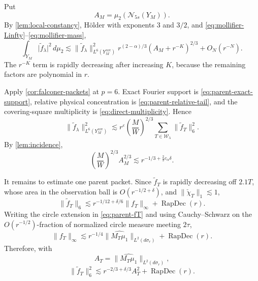 \documentclass[11pt,letterpaper]{amsart}
\newcommand{\RapDec}{\operatorname{RapDec}}
\newcommand{\cN}{\mathcal{N}}
\newcommand{\wh}{\widehat}
\newcommand{\eps}{\varepsilon}
\newcommand{\cW}{\mathcal{W}}
\newcommand{\abs}[1]{\lvert#1\rvert}
\newcommand{\norm}[1]{\lVert#1\rVert}
\begin{document}
Put
\[
 A_M=\mu_2(\cN_{5s}(Y_M)).
\]
By \cref{lem:local-constancy}, H\"older with exponents \(3\) and \(3/2\),
and \eqref{eq:mollifier-Linfty}--\eqref{eq:mollifier-mass},
\begin{equation}\label{eq:holder-local}
 \int_{Y_M}\abs{\widetilde f_\lambda}^2\,d\mu_2
 \lesssim
 \norm{\widetilde f_\lambda}_{L^6(Y_M^{\mathrm{cov}})}^2
 r^{(2-\alpha)/3}(A_M+r^{-K})^{2/3}
 +O_N(r^{-N}).
\end{equation}
The \(r^{-K}\) term is rapidly decreasing after increasing \(K\), because
the remaining factors are polynomial in \(r\).

Apply \cref{cor:falconer-packets} at \(p=6\).  Exact Fourier support is
\eqref{eq:parent-exact-support}, relative physical concentration is
\eqref{eq:parent-relative-tail}, and the covering-square multiplicity is
\eqref{eq:direct-multiplicity}.  Hence
\begin{equation}\label{eq:direct-refined}
 \norm{\widetilde f_\lambda}_{L^6(Y_M^{\mathrm{cov}})}^2
 \lesssim r^\eps
 \left(\frac{M}{W}\right)^{2/3}
 \sum_{T\in\cW_\lambda}\norm{\widetilde f_T}_6^2.
\end{equation}
By \cref{lem:incidence},
\begin{equation}\label{eq:cancellation-factor}
 \left(\frac{M}{W}\right)^{2/3}A_M^{2/3}
 \lesssim r^{-1/3+\frac23c_\alpha\delta}.
\end{equation}

It remains to estimate one parent packet.  Since
\(\widetilde f_T\) is rapidly decreasing off \(2.1T\), whose area in the
observation ball is \(O(r^{-1/2+\delta})\), and
\(\norm{\check\chi_T}_1\lesssim1\),
\[
 \norm{\widetilde f_T}_6
 \lesssim r^{-1/12+\delta/6}\norm{f_T}_\infty+\RapDec(r).
\]
Writing the circle extension in \eqref{eq:parent-fT} and using
Cauchy--Schwarz on the \(O(r^{-1/2})\)-fraction of normalized circle measure
meeting \(2\tau\),
\[
 \norm{f_T}_\infty
 \lesssim r^{-1/4}
 \norm{\wh{M_T\mu_1}}_{L^2(d\sigma_r)}
 +\RapDec(r).
\]
Therefore, with
\[
 A_T=\norm{\wh{M_T\mu_1}}_{L^2(d\sigma_r)},
\]
\begin{equation}\label{eq:parent-L6-square}
 \norm{\widetilde f_T}_6^2
 \lesssim r^{-2/3+\delta/3}A_T^2+\RapDec(r).
\end{equation}
\end{document}
